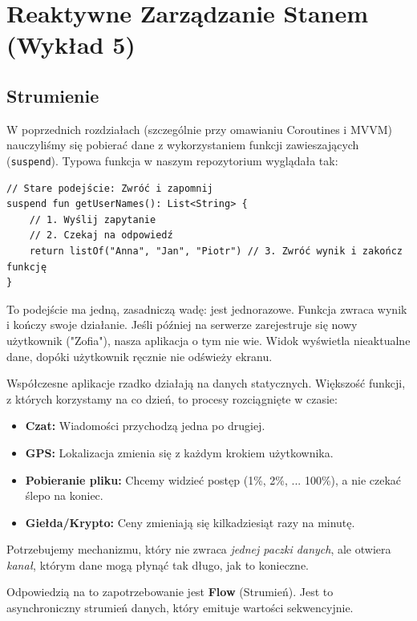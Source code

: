 \chapter{Reaktywne Zarządzanie Stanem (Wykład 5)}

\section{Strumienie}

W poprzednich rozdziałach (szczególnie przy omawianiu Coroutines i MVVM) nauczyliśmy się pobierać dane z wykorzystaniem funkcji zawieszających (\texttt{suspend}). Typowa funkcja w naszym repozytorium wyglądała tak:

\begin{verbatim}
// Stare podejście: Zwróć i zapomnij
suspend fun getUserNames(): List<String> {
    // 1. Wyślij zapytanie
    // 2. Czekaj na odpowiedź
    return listOf("Anna", "Jan", "Piotr") // 3. Zwróć wynik i zakończ funkcję
}
\end{verbatim}

To podejście ma jedną, zasadniczą wadę: jest jednorazowe. Funkcja zwraca wynik i kończy swoje działanie. Jeśli później na serwerze zarejestruje się nowy użytkownik ("Zofia"), nasza aplikacja o tym nie wie. Widok wyświetla nieaktualne dane, dopóki użytkownik ręcznie nie odświeży ekranu.

Współczesne aplikacje rzadko działają na danych statycznych. Większość funkcji, z których korzystamy na co dzień, to procesy rozciągnięte w czasie:
\begin{itemize}
    \item \textbf{Czat:} Wiadomości przychodzą jedna po drugiej.
    \item \textbf{GPS:} Lokalizacja zmienia się z każdym krokiem użytkownika.
    \item \textbf{Pobieranie pliku:} Chcemy widzieć postęp (1\%, 2\%, ... 100\%), a nie czekać ślepo na koniec.
    \item \textbf{Giełda/Krypto:} Ceny zmieniają się kilkadziesiąt razy na minutę.
\end{itemize}

Potrzebujemy mechanizmu, który nie zwraca \textit{jednej paczki danych}, ale otwiera \textit{kanał}, którym dane mogą płynąć tak długo, jak to konieczne.

Odpowiedzią na to zapotrzebowanie jest \textbf{Flow} (Strumień). Jest to asynchroniczny strumień danych, który emituje wartości sekwencyjnie. 

